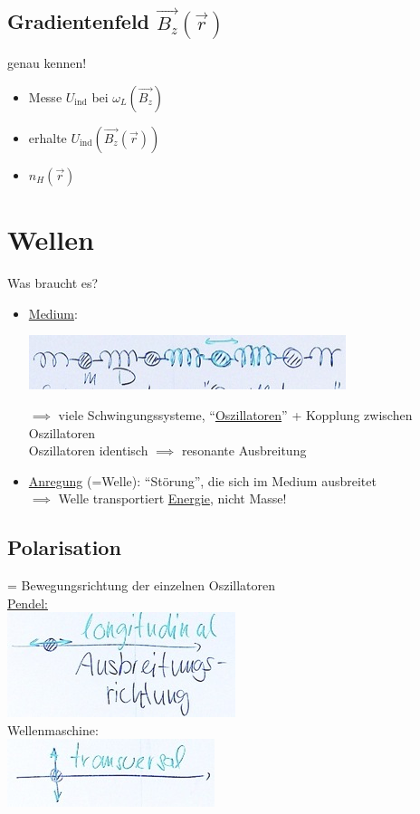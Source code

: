 \subsection{Gradientenfeld \texorpdfstring{$\vec{B_z}(\vec{r})$}{B\textsubscript{z}(r)}}
genau kennen!

\begin{itemize}[ label = $\implies$ ]
	\item Messe $U_{\text{ind}}$ bei $\omega_L( \vec{B_z} )$
	\item erhalte $U_{\text{ind}}( \vec{B_z}( \vec{r} ) )$
	\item $n_H( \vec{r} )$
\end{itemize}

\section{Wellen}
Was braucht es?
\begin{itemize}
	\item \uline{Medium}:
		\begin{bsp*}[ head = z.B. , note = Federkette ]
			\includegraphics{Bild225}
		\end{bsp*}
		$\implies$ viele Schwingungssysteme, \enquote{\uline{Oszillatoren}} + Kopplung zwischen Oszillatoren \\
		Oszillatoren identisch $\implies$ resonante Ausbreitung
	\item \uline{Anregung} (=Welle): \enquote{Störung}, die sich im Medium ausbreitet \\
		$\implies$ Welle transportiert \uline{Energie}, nicht Masse!
\end{itemize}

\subsection{Polarisation}
= Bewegungsrichtung der einzelnen Oszillatoren \\
\uline{Pendel:} \\
\includegraphics{Bild226} \\
Wellenmaschine: \\
\includegraphics{Bild227}

